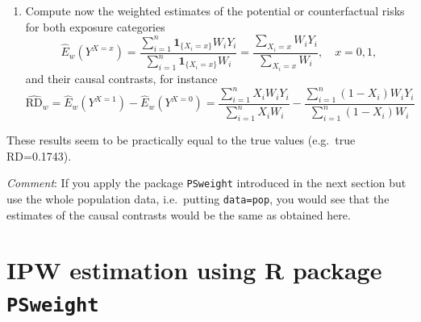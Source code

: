 \documentclass[
]{book}
\newenvironment{Shaded}{\begin{snugshade}}{\end{snugshade}}
\newcommand{\DecValTok}[1]{\textcolor[rgb]{0.00,0.00,0.81}{#1}}
\newcommand{\FunctionTok}[1]{\textcolor[rgb]{0.13,0.29,0.53}{\textbf{#1}}}
\newcommand{\NormalTok}[1]{#1}
\newcommand{\OtherTok}[1]{\textcolor[rgb]{0.56,0.35,0.01}{#1}}
\newcommand{\SpecialCharTok}[1]{\textcolor[rgb]{0.81,0.36,0.00}{\textbf{#1}}}
\providecommand{\tightlist}{%
  \setlength{\itemsep}{0pt}\setlength{\parskip}{0pt}}
\begin{document}
\begin{enumerate}
\def\labelenumi{\arabic{enumi}.}
\setcounter{enumi}{3}
\tightlist
\item
  Compute now the weighted estimates of the potential or
  counterfactual risks for both exposure categories
  \[ \widehat{E}_w(Y^{X = x}) =
  \frac{ \sum_{i=1}^n {\mathbf 1}_{ \{X_i=x\} } W_i Y_i }
     {\sum_{i=1}^n {\mathbf 1}_{ \{X_i=x\} }W_i} =
   \frac{ \sum_{X_i = x} W_i Y_i }{\sum_{X_i=x} W_i}, \quad x = 0,1, \]
  and their causal contrasts, for instance
  \[ \widehat{\text{RD}}_{w} = \widehat{E}_w(Y^{X = 1}) -
                \widehat{E}_w(Y^{X = 0})
    =  \frac{ \sum_{i=1}^n X_i W_i Y_i }{\sum_{i=1}^n X_i W_i} -
    \frac{ \sum_{i=1}^n (1-X_i) W_i Y_i }{\sum_{i=1}^n (1-X_i) W_i}\]
\end{enumerate}

\begin{Shaded}
\end{Shaded}

These results seem to be practically equal to the true values (e.g.~true
RD=0.1743).

\emph{Comment}: If you apply the package \texttt{PSweight} introduced in the next
section but
use the whole population data, i.e.~putting \texttt{data=pop}, you would see
that the estimates of the causal contrasts would be the same as obtained
here.

\section{\texorpdfstring{IPW estimation using R package \texttt{PSweight}}{IPW estimation using R package PSweight}}\label{ipw-estimation-using-r-package-psweight}
\end{document}
